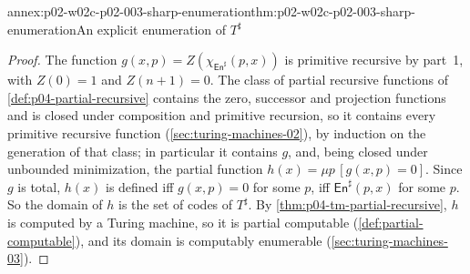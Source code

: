 \begin{annexitem}{annex:p02-w02c-p02-003-sharp-enumeration}{thm:p02-w02c-p02-003-sharp-enumeration}{An explicit enumeration of \(T^{\sharp}\)}
\begin{proof}
The function \(g(x,p)=Z(\chi_{\mathsf{En}^{\sharp}}(p,x))\) is primitive
recursive by part~1, with \(Z(0)=1\) and \(Z(n+1)=0\).  The class of partial
recursive functions of \cref{def:p04-partial-recursive} contains the zero,
successor and projection functions and is closed under composition and
primitive recursion, so it contains every primitive recursive function
(\cref{sec:turing-machines-02}), by induction on the
generation of that class; in particular it contains \(g\), and, being closed
under unbounded minimization, the partial function
\(h(x)=\mu p\,[g(x,p)=0]\).  Since \(g\) is total, \(h(x)\) is defined iff
\(g(x,p)=0\) for some \(p\), iff \(\mathsf{En}^{\sharp}(p,x)\) for some
\(p\).  So the domain of \(h\) is the set of codes of \(T^{\sharp}\).  By
\cref{thm:p04-tm-partial-recursive}, \(h\) is computed by a Turing machine,
so it is partial computable (\cref{def:partial-computable}), and its
domain is computably enumerable (\cref{sec:turing-machines-03}).
\end{proof}
\end{annexitem}

